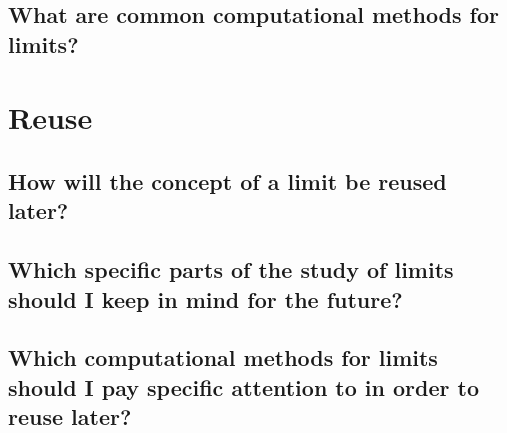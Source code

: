 \subsection{What are common computational methods for limits?}

\section{Reuse}
\subsection{How will the concept of a limit be reused later?}
\subsection{Which specific parts of the study of limits should I keep in mind for the future?}
\subsection{Which computational methods for limits should I pay specific attention to in order to reuse later?}
